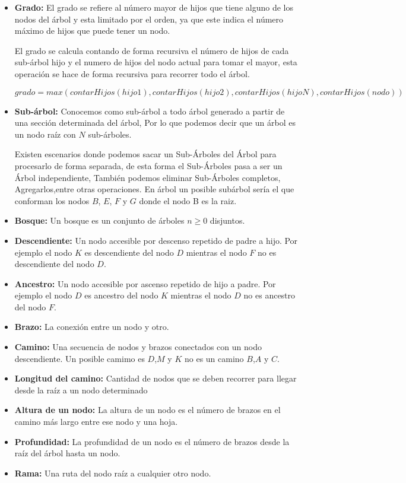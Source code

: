 \begin{itemize}
	\item \textbf{Grado:} El grado se refiere al número mayor de hijos que tiene alguno de los nodos del árbol y esta limitado por el orden, ya que este indica el número máximo de hijos que puede tener un nodo.
	
	El grado se calcula contando de forma recursiva el número de hijos de cada sub-árbol hijo y el numero de hijos del nodo actual para tomar el mayor, esta operación se hace de forma recursiva para recorrer todo el árbol.
	
	$$ grado = max(contarHijos(hijo1),contarHijos(hijo2), contarHijos(hijoN), contarHijos(nodo)) $$
	
	\item \textbf{Sub-árbol:} Conocemos como sub-árbol a todo árbol generado a partir de una sección determinada del árbol, Por lo que podemos decir que un árbol es un nodo raíz con $N$ sub-árboles.
	
	Existen escenarios donde podemos sacar un Sub-Árboles del Árbol para procesarlo de forma separada, de esta forma el Sub-Árboles pasa a ser un Árbol independiente, También podemos eliminar Sub-Árboles completos, Agregarlos,entre otras operaciones. En árbol un posible subárbol sería el que conforman los nodos $B$, $E$, $F$ y $G$ donde el nodo B es la raiz.
	
	\item \textbf{Bosque:} Un bosque es un conjunto de árboles $n \ge 0 $ disjuntos.
	
	\item \textbf{Descendiente:} Un nodo accesible por descenso repetido de padre a hijo. Por ejemplo el nodo $K$ es descendiente del nodo $D$ mientras el nodo $F$ no es descendiente del nodo $D$.
	
	\item \textbf{Ancestro:} Un nodo accesible por ascenso repetido de hijo a padre. Por ejemplo el nodo $D$ es ancestro del nodo $K$ mientras el nodo $D$ no es ancestro del nodo $F$. 
	
	\item \textbf{Brazo:} La conexión entre un nodo y otro.
	
	\item \textbf{Camino:} Una secuencia de nodos y brazos conectados con un nodo descendiente. Un posible camimo es $D$,$M$ y $K$ no es un camino $B$,$A$ y $C$.
	
	\item \textbf{Longitud del camino:} Cantidad de nodos que se deben recorrer para llegar desde la raíz a un nodo determinado
	
	\item \textbf{Altura de un nodo:} La altura de un nodo es el número de brazos en el camino más largo entre ese nodo y una hoja.
	
	\item \textbf{Profundidad:} La profundidad de un nodo es el número de brazos desde la raíz del árbol hasta un nodo.
	
	
	
	\item \textbf{Rama:} Una ruta del nodo raíz a cualquier otro nodo.
\end{itemize}